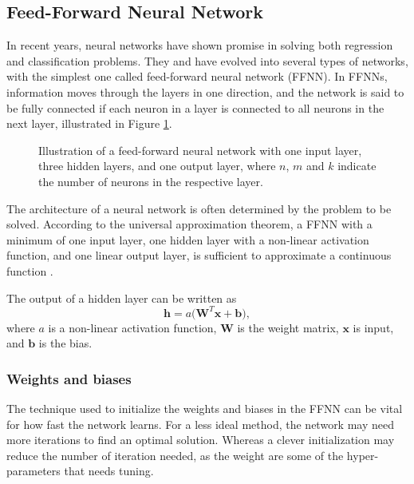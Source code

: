 \subsection{Feed-Forward Neural Network}\label{ssec:ffnn}
In recent years, neural networks have shown promise in solving both regression and classification problems. They and have evolved into several types of networks, with the simplest one called feed-forward neural network (FFNN). In FFNNs, information moves through the layers in one direction, and the network is said to be fully connected if each neuron in a layer is connected to all neurons in the next layer, illustrated in Figure \ref{fig:ffnn}. 

\begin{figure}[h!]
    \centering
    \resizebox{0.9\linewidth}{!}
    {}
    \caption{Illustration of a feed-forward neural network with one input layer, three hidden layers, and one output layer, where $n$, $m$ and $k$ indicate the number of neurons in the respective layer.}
    \label{fig:ffnn}
\end{figure}
The architecture of a neural network is often determined by the problem to be solved. According to the universal approximation theorem, a FFNN with a minimum of one input layer, one hidden layer with a non-linear activation function, and one linear output layer, is sufficient to approximate a continuous function \cite[194]{Goodfellow:2016:deep_learning}. 

The output of a hidden layer can be written as 
\begin{equation}\label{eq:ffnn}
    \mathbf{h} = a \Big( \mathbf{W}^{T} \mathbf{x} + \mathbf{b} \Big) ,
\end{equation}
where $a$ is a non-linear activation function, $\mathbf{W}$ is the weight matrix, $\mathbf{x}$ is input, and $\mathbf{b}$ is the bias. 

\subsubsection{Weights and biases}\label{sssec:weights_biases}
The technique used to initialize the weights and biases in the FFNN can be vital for how fast the network learns. For a less ideal method, the network may need more iterations to find an optimal solution. Whereas a clever initialization may reduce the number of iteration needed, as the weight are some of the hyper-parameters that needs tuning. 

